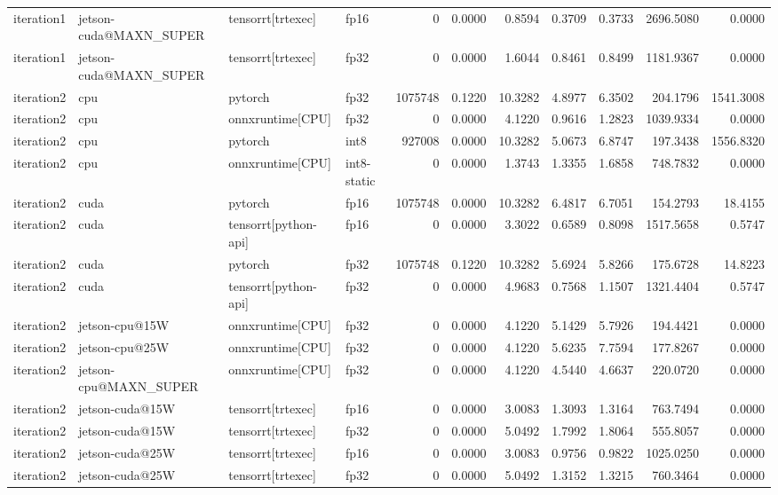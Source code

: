 \begin{table}
\begin{tabular}{llllrrrrrrr}
iteration1 & jetson-cuda@MAXN\_SUPER & tensorrt[trtexec] & fp16 & 0 & 0.0000 & 0.8594 & 0.3709 & 0.3733 & 2696.5080 & 0.0000 \\
iteration1 & jetson-cuda@MAXN\_SUPER & tensorrt[trtexec] & fp32 & 0 & 0.0000 & 1.6044 & 0.8461 & 0.8499 & 1181.9367 & 0.0000 \\
iteration2 & cpu & pytorch & fp32 & 1075748 & 0.1220 & 10.3282 & 4.8977 & 6.3502 & 204.1796 & 1541.3008 \\
iteration2 & cpu & onnxruntime[CPU] & fp32 & 0 & 0.0000 & 4.1220 & 0.9616 & 1.2823 & 1039.9334 & 0.0000 \\
iteration2 & cpu & pytorch & int8 & 927008 & 0.0000 & 10.3282 & 5.0673 & 6.8747 & 197.3438 & 1556.8320 \\
iteration2 & cpu & onnxruntime[CPU] & int8-static & 0 & 0.0000 & 1.3743 & 1.3355 & 1.6858 & 748.7832 & 0.0000 \\
iteration2 & cuda & pytorch & fp16 & 1075748 & 0.0000 & 10.3282 & 6.4817 & 6.7051 & 154.2793 & 18.4155 \\
iteration2 & cuda & tensorrt[python-api] & fp16 & 0 & 0.0000 & 3.3022 & 0.6589 & 0.8098 & 1517.5658 & 0.5747 \\
iteration2 & cuda & pytorch & fp32 & 1075748 & 0.1220 & 10.3282 & 5.6924 & 5.8266 & 175.6728 & 14.8223 \\
iteration2 & cuda & tensorrt[python-api] & fp32 & 0 & 0.0000 & 4.9683 & 0.7568 & 1.1507 & 1321.4404 & 0.5747 \\
iteration2 & jetson-cpu@15W & onnxruntime[CPU] & fp32 & 0 & 0.0000 & 4.1220 & 5.1429 & 5.7926 & 194.4421 & 0.0000 \\
iteration2 & jetson-cpu@25W & onnxruntime[CPU] & fp32 & 0 & 0.0000 & 4.1220 & 5.6235 & 7.7594 & 177.8267 & 0.0000 \\
iteration2 & jetson-cpu@MAXN\_SUPER & onnxruntime[CPU] & fp32 & 0 & 0.0000 & 4.1220 & 4.5440 & 4.6637 & 220.0720 & 0.0000 \\
iteration2 & jetson-cuda@15W & tensorrt[trtexec] & fp16 & 0 & 0.0000 & 3.0083 & 1.3093 & 1.3164 & 763.7494 & 0.0000 \\
iteration2 & jetson-cuda@15W & tensorrt[trtexec] & fp32 & 0 & 0.0000 & 5.0492 & 1.7992 & 1.8064 & 555.8057 & 0.0000 \\
iteration2 & jetson-cuda@25W & tensorrt[trtexec] & fp16 & 0 & 0.0000 & 3.0083 & 0.9756 & 0.9822 & 1025.0250 & 0.0000 \\
iteration2 & jetson-cuda@25W & tensorrt[trtexec] & fp32 & 0 & 0.0000 & 5.0492 & 1.3152 & 1.3215 & 760.3464 & 0.0000 \\

\end{tabular}
\end{table}
